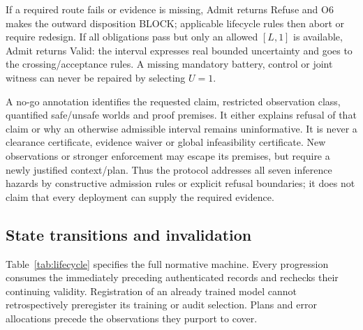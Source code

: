 If a required route fails or evidence is missing, Admit returns Refuse and
O6 makes the outward disposition BLOCK; applicable lifecycle rules then
abort or require redesign. If all obligations pass but only an allowed
$[L,1]$ is available, Admit returns Valid: the interval expresses real
bounded uncertainty and goes to the crossing/acceptance rules. A missing
mandatory battery, control or joint witness can never be repaired by
selecting $U=1$.

A no-go annotation identifies the requested claim, restricted observation
class, quantified safe/unsafe worlds and proof premises. It either explains
refusal of that claim or why an otherwise admissible interval remains
uninformative. It is never a clearance certificate, evidence waiver or
global infeasibility certificate. New observations or stronger enforcement
may escape its premises, but require a newly justified context/plan.
Thus the protocol addresses all seven inference hazards by constructive
admission rules or explicit refusal boundaries; it does not claim that every
deployment can supply the required evidence.

\subsection{State transitions and invalidation}
Table~\ref{tab:lifecycle} specifies the full normative machine. Every progression
consumes the immediately preceding authenticated records and rechecks their
continuing validity. Registration of an already trained model cannot
retrospectively preregister its training or audit selection. Plans and error
allocations precede the observations they purport to cover.

